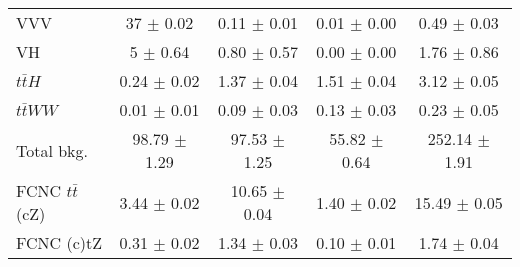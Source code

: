 \begin{tabular}{|l|c|c|c|c|}
    VVV &                   37 $\pm$ 0.02     & 0.11 $\pm$ 0.01   & 0.01 $\pm$ 0.00   &  0.49 $\pm$ 0.03   \\
    VH &                    5 $\pm$ 0.64      & 0.80 $\pm$ 0.57   & 0.00 $\pm$ 0.00   &  1.76 $\pm$ 0.86   \\
    $t\bar{t}H$ &           0.24 $\pm$ 0.02   & 1.37 $\pm$ 0.04   & 1.51 $\pm$ 0.04   &  3.12 $\pm$ 0.05   \\
    $t\bar{t}WW$ &          0.01 $\pm$ 0.01   & 0.09 $\pm$ 0.03   & 0.13 $\pm$ 0.03   &  0.23 $\pm$ 0.05   \\
    \hline                                                                            
    Total bkg. &            98.79 $\pm$ 1.29  & 97.53 $\pm$ 1.25  & 55.82 $\pm$ 0.64  &  252.14 $\pm$ 1.91  \\
    \hline                                                                            
    FCNC $t\bar{t}$(cZ) &        3.44 $\pm$ 0.02   & 10.65 $\pm$ 0.04  & 1.40 $\pm$ 0.02   &  15.49 $\pm$ 0.05  \\
    FCNC (c)tZ &            0.31 $\pm$ 0.02   & 1.34 $\pm$ 0.03   & 0.10 $\pm$ 0.01   &  1.74 $\pm$ 0.04  \\
    \hline                                                                                     
\end{tabular}
